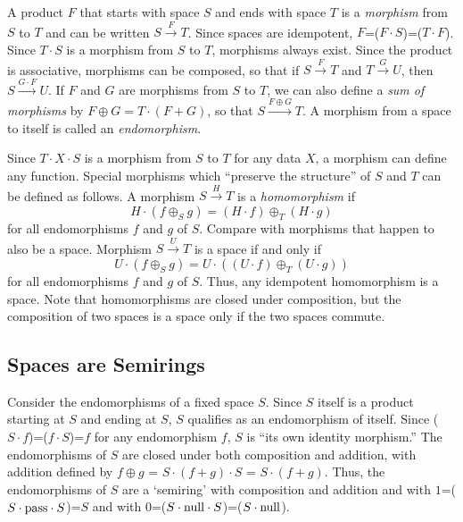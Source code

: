 \documentclass[11pt]{article}
\begin{document}
A product $F$ that starts with space $S$ and ends with space $T$ is a {\it morphism} from $S$ to $T$ and can be written $S{\overset F\longrightarrow}T$.
Since spaces are idempotent, $F$=($F\cdot S$)=($T\cdot F$).  Since $T\cdot S$ is a morphism from $S$ to $T$, morphisms always exist.  
Since the product is associative, morphisms can be composed, so that if $S{\overset F\longrightarrow}T$ and 
$T{\overset G\longrightarrow}U$, then $S{\overset {G\cdot F}\longrightarrow}U$.  
If $F$ and $G$ are morphisms from $S$ to $T$, we can also define a {\it sum of morphisms} by $F \oplus G = T\cdot (F+G)$, so that 
$S{\overset {F\oplus G}\longrightarrow}T$.  A morphism from a space to itself is called an {\it endomorphism}. 

    Since $T\cdot X\cdot S$ is a morphism from $S$ to $T$ for any data $X$, a morphism can define any function.  Special morphisms which 
``preserve the structure'' of $S$ and $T$ can be defined as follows.  A morphism $S{\overset H\longrightarrow}T$ is a {\it homomorphism} if 
\begin{equation}
H\cdot (f\oplus_S g) = (H\cdot f) \oplus_T (H\cdot g) 
\end{equation}
for all endomorphisms $f$ and $g$ of $S$.  Compare with morphisms that happen to also be a space.  Morphism $S{\overset U\longrightarrow}T$ is a space if and only if 
\begin{equation}
U\cdot (f\oplus_S g) = U\cdot ((U\cdot f) \oplus_T (U\cdot g)) 
\end{equation}
for all endomorphisms $f$ and $g$ of $S$.  Thus, any idempotent homomorphism is a space.  
Note that homomorphisms are closed under composition, but the composition of two spaces is a space 
only if the two spaces commute.  

\subsection{Spaces are Semirings} 

     Consider the endomorphisms of a fixed space $S$.  Since $S$ itself is a product starting at $S$ and ending at $S$, $S$ qualifies as an endomorphism of itself.  	
 Since ($S\cdot f$)=($f\cdot S$)=$f$ for any endomorphism $f$, $S$ is ``its own identity morphism.''  The endomorphisms 
of $S$ are closed under both composition and addition, with addition defined by $f\oplus g$ = $S\cdot(f+g)\cdot S$ = $S\cdot(f+g)$.  
Thus, the endomorphisms of $S$ are a `semiring' with composition and addition and with $1$=($S\cdot {\rm pass}\cdot S$)=$S$ and with 
$0$=($S\cdot {\rm null}\cdot S$)=($S\cdot {\rm null}$).  
\end{document}
